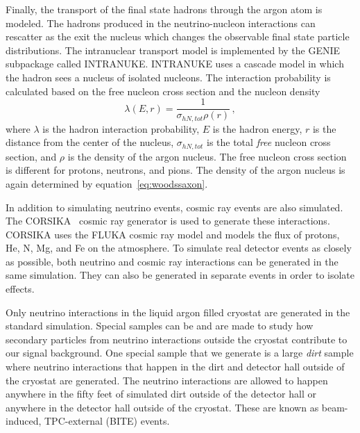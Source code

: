     Finally, the transport of the final state hadrons through the argon atom is
    modeled. The hadrons produced in the neutrino-nucleon interactions can
    rescatter as the exit the nucleus which changes the observable final state
    particle distributions. The intranuclear transport model is implemented by
    the GENIE subpackage called INTRANUKE. INTRANUKE uses a cascade model in
    which the hadron sees a nucleus of isolated nucleons. The interaction
    probability is calculated based on the free nucleon cross section and the
    nucleon density~\cite{Andreopoulos:2015wxa}
    \begin{equation}
      \lambda(E,r) = \frac{1}{\sigma_{hN,tot} \rho(r)} \,,
    \end{equation}
    where $\lambda$ is the hadron interaction probability, $E$ is the hadron
    energy, $r$ is the distance from the center of the nucleus,
    $\sigma_{hN,tot}$ is the total \textit{free} nucleon cross section, and
    $\rho$ is the density of the argon nucleus. The free nucleon cross section
    is different for protons, neutrons, and pions. The density of the argon
    nucleus is again determined by equation~\ref{eq:woodssaxon}.

    In addition to simulating neutrino events, cosmic ray events are also
    simulated. The CORSIKA~\cite{corsika} cosmic ray generator is used to
    generate these interactions. CORSIKA uses the FLUKA cosmic ray model and
    models the flux of protons, He, N, Mg, and Fe on the atmosphere.  To
    simulate real detector events as closely as possible, both neutrino and
    cosmic ray interactions can be generated in the same simulation. They can
    also be generated in separate events in order to isolate effects.

    Only neutrino interactions in the liquid argon filled cryostat are
    generated in the standard simulation. Special samples can be and are made
    to study how secondary particles from neutrino interactions outside the
    cryostat contribute to our signal background. One special sample that we
    generate is a large \textit{dirt} sample where neutrino interactions that
    happen in the dirt and detector hall outside of the cryostat are generated.
    The neutrino interactions are allowed to happen anywhere in the fifty feet
    of simulated dirt outside of the detector hall or anywhere in the detector
    hall outside of the cryostat. These are known as beam-induced, TPC-external
    (BITE) events.

